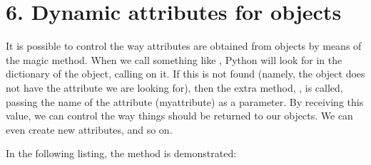 \documentclass[a4paper,10pt,english]{sphinxmanual}
\begin{document}
\section{6. Dynamic attributes for objects}
\label{\detokenize{chapters/2_pythonic_code/index:dynamic-attributes-for-objects}}
It is possible to control the way attributes are obtained from objects by means of the  magic method.
When we call something like , Python will look for  in the dictionary of
the object, calling  on it. If this is not found (namely, the object does not have the attribute we
are looking for), then the extra method, , is called, passing the name of the attribute (myattribute) as
a parameter. By receiving this value, we can control the way things should be returned to our objects. We can even
create new attributes, and so on.

In the following listing, the  method is demonstrated:

\begin{sphinxVerbatim}[commandchars=\\\{\}]
 
      
          

      
         
               
             
         
\end{sphinxVerbatim}
\end{document}
